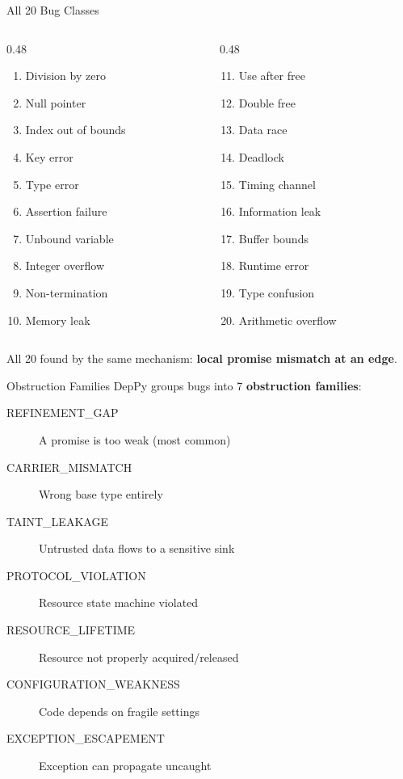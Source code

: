 \documentclass[aspectratio=169,10pt]{beamer}
\begin{document}
\begin{frame}{All 20 Bug Classes}
{\scriptsize
\begin{columns}[T]
\begin{column}{0.48\textwidth}
\begin{enumerate}
  \item Division by zero
  \item Null pointer
  \item Index out of bounds
  \item Key error
  \item Type error
  \item Assertion failure
  \item Unbound variable
  \item Integer overflow
  \item Non-termination
  \item Memory leak
\end{enumerate}
\end{column}
\begin{column}{0.48\textwidth}
\begin{enumerate}\setcounter{enumi}{10}
  \item Use after free
  \item Double free
  \item Data race
  \item Deadlock
  \item Timing channel
  \item Information leak
  \item Buffer bounds
  \item Runtime error
  \item Type confusion
  \item Arithmetic overflow
\end{enumerate}
\end{column}
\end{columns}}
\vspace{0.3em}
All 20 found by the same mechanism: \textbf{local promise mismatch at an edge}.
\end{frame}

\begin{frame}{Obstruction Families}
DepPy groups bugs into 7 \textbf{obstruction families}:
\vspace{0.3em}
{\small
\begin{description}
  \item[REFINEMENT\_GAP] A promise is too weak (most common)
  \item[CARRIER\_MISMATCH] Wrong base type entirely
  \item[TAINT\_LEAKAGE] Untrusted data flows to a sensitive sink
  \item[PROTOCOL\_VIOLATION] Resource state machine violated
  \item[RESOURCE\_LIFETIME] Resource not properly acquired/released
  \item[CONFIGURATION\_WEAKNESS] Code depends on fragile settings
  \item[EXCEPTION\_ESCAPEMENT] Exception can propagate uncaught
\end{description}}
\end{frame}
\end{document}
